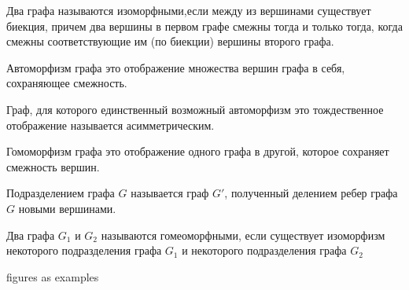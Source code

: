 
\begin{definition}
  Два графа называются изоморфными,если между из вершинами существует биекция,
  причем два вершины в первом графе смежны тогда и только тогда, когда смежны
  соответствующие им (по биекции) вершины второго графа.
\end{definition}

\begin{definition}
  Автоморфизм графа это отображение множества вершин графа в себя, сохраняющее
  смежность.
\end{definition}

\begin{remark}
  Граф, для которого единственный возможный автоморфизм это тождественное
  отображение называется асимметрическим.
\end{remark}

\begin{definition}
  Гомоморфизм графа это отображение одного графа в другой, которое сохраняет
  смежность вершин.
\end{definition}

\begin{definition}
  Подразделением графа \(G\) называется граф \(G'\), полученный делением ребер
  графа \(G\) новыми вершинами.
\end{definition}

\begin{definition}
  Два графа \(G_{1}\) и \(G_{2}\) называются гомеоморфными, если существует
  изоморфизм некоторого подразделения графа \(G_{1}\) и некоторого подразделения
  графа \(G_{2}\)
\end{definition}

\todo figures as examples
